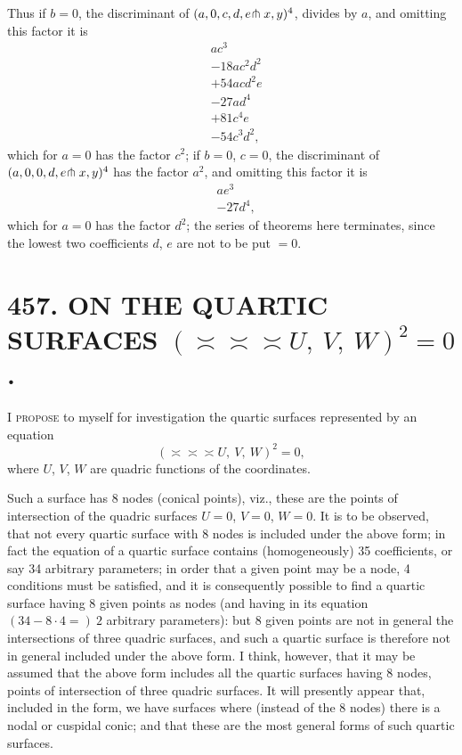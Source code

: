 \documentclass[11pt,a4paper]{article}
\newcommand{\article}[2]{\section*{#1. #2}}
\begin{document}
Thus if $b=0$, the discriminant of $(a,0,c,d,e\hspace{-0.2em}\pitchfork x,y)^{4}$, divides by $a$, and omitting this factor it is
\begin{align*}
&ac^{3}\\
&- 18ac^{2}d^{2}\\
&+ 54acd^{2}e\\
&- 27ad^{4}\\
&+ 81c^{4}e\\
&- 54c^{3}d^{2},
\end{align*}
which for $a=0$ has the factor $c^{2}$; if $b=0$, $c=0$, the discriminant of $(a,0,0,d,e\hspace{-0.2em}\pitchfork x,y)^{4}$ has the factor $a^{2}$, and omitting this factor it is
\begin{align*}
&ae^{3}\\
&- 27d^{4},
\end{align*}
which for $a=0$ has the factor $d^{2}$; the series of theorems here terminates, since the lowest two coefficients $d$, $e$ are not to be put $=0$.

\newpage
\setcounter{page}{304}

\article{457}{ON THE QUARTIC SURFACES $(\asymp\!\asymp\!\asymp U,\ V,\ W)^{2} = 0$.}


\vspace{0.5em}

I \textsc{propose} to myself for investigation the quartic surfaces represented by an equation
\[
(\asymp\!\asymp\!\asymp U,\ V,\ W)^{2} = 0,
\]
where $U$, $V$, $W$ are quadric functions of the coordinates.

Such a surface has 8 nodes (conical points), viz., these are the points of intersection of the quadric surfaces $U=0$, $V=0$, $W=0$. It is to be observed, that not every quartic surface with 8 nodes is included under the above form; in fact the equation of a quartic surface contains (homogeneously) 35 coefficients, or say 34 arbitrary parameters; in order that a given point may be a node, 4 conditions must be satisfied, and it is consequently possible to find a quartic surface having 8 given points as nodes (and having in its equation $(34 - 8 \cdot 4 =)\ 2$ arbitrary parameters): but 8 given points are not in general the intersections of three quadric surfaces, and such a quartic surface is therefore not in general included under the above form. I think, however, that it may be assumed that the above form includes all the quartic surfaces having 8 nodes, points of intersection of three quadric surfaces. It will presently appear that, included in the form, we have surfaces where (instead of the 8 nodes) there is a nodal or cuspidal conic; and that these are the most general forms of such quartic surfaces.
\end{document}

